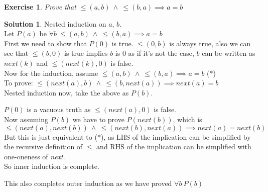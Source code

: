 \documentclass[a4paper,10pt]{article}
\newtheorem{exercise}{Exercise}[section]
\theoremstyle{definition} %
\newtheorem*{solution}{Solution}
\begin{document}
    \begin{exercise}
        Prove that $\leq(a,b) \ \land \ \leq(b,a) \implies a = b$
    \end{exercise}
    \begin{solution}
        Nested induction on $a$, $b$.\\
        Let $P(a)$ be $\forall b \ \leq(a,b) \ \land \ \leq(b,a) \implies a = b$ \\
        First we need to show that $P(0)$ is true. $\leq(0,b)$ is always true, also
        we can see that $\leq(b,0)$ is true implies $b$ is $0$ as if it's not the case,
        $b$ can be written as $next(k)$ and $\leq(next(k),0)$ is false. \\
        Now for the induction, assume $\leq(a,b) \ \land \ \leq(b,a) \implies a = b$ \quad ($\ast$)\\
        To prove: $\leq(next(a),b) \ \land \ \leq(b,next(a)) \implies next(a) = b$ \\
        Nested induction now, take the above as $P(b)$. 
        \begin{adjustwidth}{2cm}{0cm}
            $P(0)$ is a vacuous truth as $\leq(next(a),0)$ is false. \\
            Now assuming $P(b)$ we have to prove $P(next(b))$, which is \\
            $\leq(next(a),next(b)) \ \land \ \leq(next(b),next(a)) \implies next(a) = next(b)$ \\
            But this is just equivalent to ($\ast$), as LHS of the implication can be 
            simplified by the recursive definition of $\leq$ and RHS of the implication can be 
            simplified with one-oneness of \emph{next}. \\
            So inner induction is complete.
        \end{adjustwidth}
        This also completes outer induction as we have proved $\forall b \ P(b)$
    \end{solution}
\end{document}
